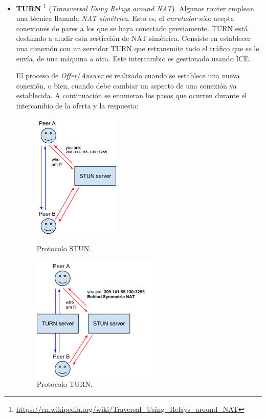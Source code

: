 \documentclass[a4paper, 12pt]{book}
\begin{document}
\begin{itemize}
\item \textbf{TURN} \footnote{\url{https://en.wikipedia.org/wiki/Traversal_Using_Relays_around_NAT}} (\textit{Transversal Using Relays around NAT}). Algunos router emplean una técnica llamada \textit{NAT simétrica}. Esto es, el \textit{enrutador} sólo acepta conexiones de pares a los que se haya conectado previamente. TURN está destinado a aludir esta resticción de NAT simétrica. Consiste en establecer una conexión con un servidor TURN que retransmite todo el tráfico que se le envía, de una máquina a otra. Este intercambio es gestionado usando ICE.

El proceso de \textit{Offer}/\textit{Answer} es realizado cuando se establece una nueva conexión, o bien, cuando debe cambiar un aspecto de una conexión ya establecida. A continuación se enumeran los pasos que ocurren durante el intercambio de la oferta y la respuesta:


\begin{figure}[H]
  \centering
  \begin{minipage}[b]{0.4\textwidth}
    \includegraphics[width=\textwidth,height=60mm]{img/stun.png}
    \caption{Protocolo STUN.}
    \label{figura:stun}
  \end{minipage}
  \hfill
  \begin{minipage}[b]{0.4\textwidth}
    \includegraphics[width=\textwidth,height=60mm]{img/turn.png}
    \caption{Protocolo TURN.}
    \label{figura:turn}
  \end{minipage}
\end{figure}


\end{itemize}
\end{document}
